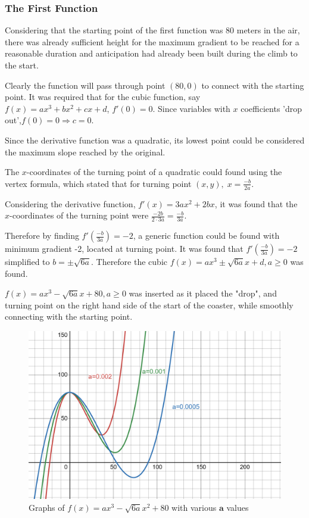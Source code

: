\documentclass[11pt, letterpaper]{article}
\begin{document}
\subsubsection{The First Function}

Considering that the starting point of the first function was 80 meters in the air, there was already sufficient height for the maximum gradient to be reached for a reasonable duration and  anticipation had already been built during the climb to the start.

Clearly the function will pass through point $(80, 0)$ to connect with the starting point. It was required that for the cubic function, say $f(x)=ax^3 +bx^2 +cx +d$, $f'(0)=0$. Since variables with $x$ coefficients 'drop out',$f(0)=0\Rightarrow c=0$.

Since the derivative function was a quadratic, its lowest point could be considered the maximum slope reached by the original.

The $x$-coordinates of the turning point of a quadratic could found using the vertex formula, which stated that for turning point $(x, y),\; x=\frac{-b}{2a}$.

Considering the derivative function, $f'(x)=3ax^2+2bx$, it was found that the $x$-coordinates of the turning point were $\frac{-2b}{2\cdot3a}=\frac{-b}{3a}$.

Therefore by finding $f'(\frac{-b}{3a})=-2$, a generic function could be found with minimum gradient -2, located at turning point. It was found that $f'(\frac{-b}{3a})=-2$ simplified to $b=\pm\sqrt{6a}$. Therefore the cubic $f(x)=ax^3\pm\sqrt{6a}x+d, a\geq0$ was found. 

$f(x)=ax^3-\sqrt{6a}x+80, a\geq0$ was inserted as it placed the "drop", and turning point on the right hand side of the start of the coaster, while smoothly connecting with the starting point. 
		\begin{figure}[h]
		\centering
		\includegraphics[width=15cm]{Eaxmple Cubic.png}
		\caption{Graphs of $f(x)=ax^{3}-\sqrt{6a}x^{2}+80$ with various $\mathbf{a}$ values}
	\end{figure}
\end{document}
